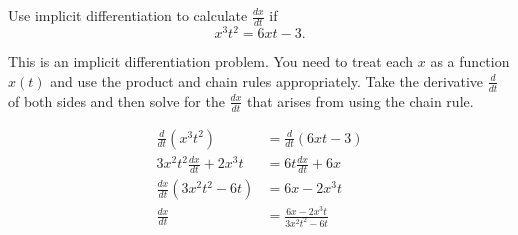 \documentclass{ximera}
\author{Emma Smith Zbarsky}
\begin{document}
\begin{exercise}

Use implicit differentiation to calculate $\frac{dx}{dt}$ if
\[x^3t^2 = 6xt-3.\]


\begin{hint}
This is an implicit differentiation problem. You need to treat each $x$
as a function $x(t)$ and use the product and chain rules appropriately.
Take the derivative $\frac{d}{dt}$ of both sides and then solve for the
$\frac{dx}{dt}$ that arises from using the chain rule.
\end{hint}


\begin{hint}
\begin{align*}
\frac{d}{dt}\left(x^3t^2\right) &= \frac{d}{dt}\left(6xt-3\right) \\
3x^2t^2\frac{dx}{dt}+2x^3t &= 6t\frac{dx}{dt} + 6x \\
\frac{dx}{dt}\left(3x^2t^2-6t\right) &= 6x-2x^3t \\
\frac{dx}{dt} &= \frac{6x-2x^3t}{3x^2t^2-6t} 
\end{align*}
\end{hint}


\begin{multipleChoice}
\end{multipleChoice}

\end{exercise}
\end{document}
